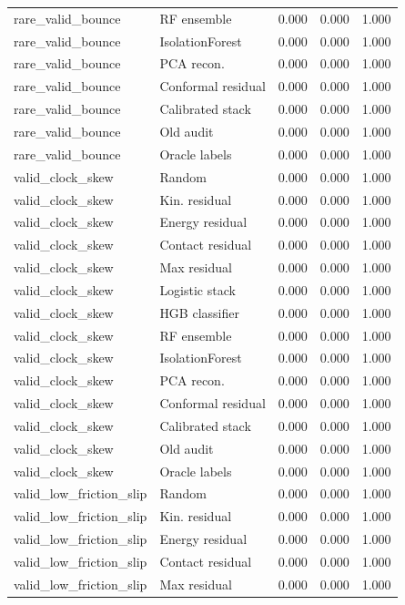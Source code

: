 {\begin{longtable}{llrrr}
rare\_valid\_bounce & RF ensemble & 0.000 & 0.000 & 1.000 \\
rare\_valid\_bounce & IsolationForest & 0.000 & 0.000 & 1.000 \\
rare\_valid\_bounce & PCA recon. & 0.000 & 0.000 & 1.000 \\
rare\_valid\_bounce & Conformal residual & 0.000 & 0.000 & 1.000 \\
rare\_valid\_bounce & Calibrated stack & 0.000 & 0.000 & 1.000 \\
rare\_valid\_bounce & Old audit & 0.000 & 0.000 & 1.000 \\
rare\_valid\_bounce & Oracle labels & 0.000 & 0.000 & 1.000 \\
valid\_clock\_skew & Random & 0.000 & 0.000 & 1.000 \\
valid\_clock\_skew & Kin. residual & 0.000 & 0.000 & 1.000 \\
valid\_clock\_skew & Energy residual & 0.000 & 0.000 & 1.000 \\
valid\_clock\_skew & Contact residual & 0.000 & 0.000 & 1.000 \\
valid\_clock\_skew & Max residual & 0.000 & 0.000 & 1.000 \\
valid\_clock\_skew & Logistic stack & 0.000 & 0.000 & 1.000 \\
valid\_clock\_skew & HGB classifier & 0.000 & 0.000 & 1.000 \\
valid\_clock\_skew & RF ensemble & 0.000 & 0.000 & 1.000 \\
valid\_clock\_skew & IsolationForest & 0.000 & 0.000 & 1.000 \\
valid\_clock\_skew & PCA recon. & 0.000 & 0.000 & 1.000 \\
valid\_clock\_skew & Conformal residual & 0.000 & 0.000 & 1.000 \\
valid\_clock\_skew & Calibrated stack & 0.000 & 0.000 & 1.000 \\
valid\_clock\_skew & Old audit & 0.000 & 0.000 & 1.000 \\
valid\_clock\_skew & Oracle labels & 0.000 & 0.000 & 1.000 \\
valid\_low\_friction\_slip & Random & 0.000 & 0.000 & 1.000 \\
valid\_low\_friction\_slip & Kin. residual & 0.000 & 0.000 & 1.000 \\
valid\_low\_friction\_slip & Energy residual & 0.000 & 0.000 & 1.000 \\
valid\_low\_friction\_slip & Contact residual & 0.000 & 0.000 & 1.000 \\
valid\_low\_friction\_slip & Max residual & 0.000 & 0.000 & 1.000 \\

\end{longtable}}
